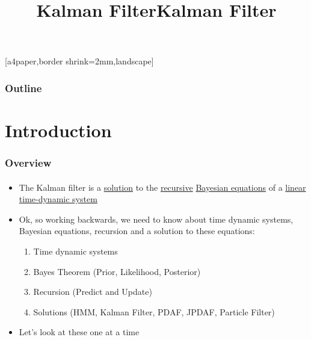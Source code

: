 

\title{Kalman Filter}


\mypagenum{}
{
	[a4paper,border shrink=2mm,landscape] 
}
{
}


\begin{frame}[plain]
\title{Kalman Filter}
\titlepage
\end{frame}



\begin{frame}
\frametitle{Outline}
\setcounter{tocdepth}{2}	
\tableofcontents
\end{frame}




\section{Introduction}
\begin{frame}
\frametitle{Overview}
\framesubtitle{}
\mypagenum
\begin{itemize}
\item The Kalman filter is a \underline{solution} to the \underline{recursive} \underline{Bayesian equations} of a \underline{linear time-dynamic system}
\item Ok, so working backwards, we need to know about time dynamic systems, Bayesian equations, recursion and a solution to these equations:
\begin{enumerate}
\item Time dynamic systems
\item Bayes Theorem (Prior, Likelihood, Posterior)
\item Recursion (Predict and Update)
\item Solutions (HMM, Kalman Filter, PDAF, JPDAF, Particle Filter)
\end{enumerate}
\item Let's look at these one at a time
\end{itemize}
\end{frame}





